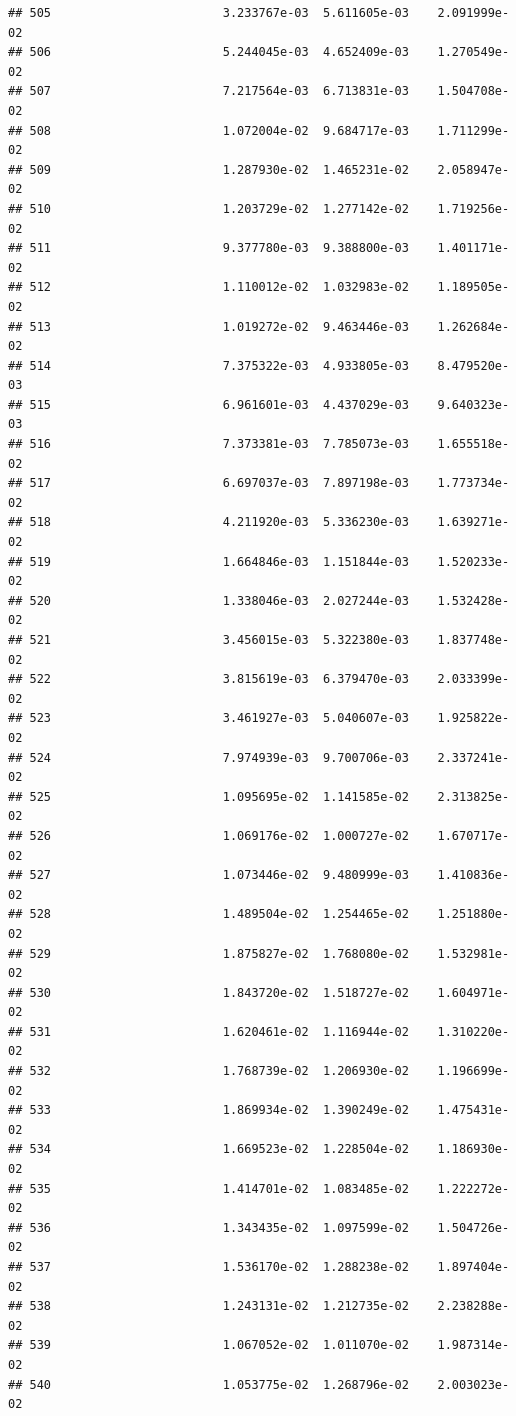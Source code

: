 \documentclass[
]{article}
\begin{document}
\begin{verbatim}
## 505                        3.233767e-03  5.611605e-03    2.091999e-02
## 506                        5.244045e-03  4.652409e-03    1.270549e-02
## 507                        7.217564e-03  6.713831e-03    1.504708e-02
## 508                        1.072004e-02  9.684717e-03    1.711299e-02
## 509                        1.287930e-02  1.465231e-02    2.058947e-02
## 510                        1.203729e-02  1.277142e-02    1.719256e-02
## 511                        9.377780e-03  9.388800e-03    1.401171e-02
## 512                        1.110012e-02  1.032983e-02    1.189505e-02
## 513                        1.019272e-02  9.463446e-03    1.262684e-02
## 514                        7.375322e-03  4.933805e-03    8.479520e-03
## 515                        6.961601e-03  4.437029e-03    9.640323e-03
## 516                        7.373381e-03  7.785073e-03    1.655518e-02
## 517                        6.697037e-03  7.897198e-03    1.773734e-02
## 518                        4.211920e-03  5.336230e-03    1.639271e-02
## 519                        1.664846e-03  1.151844e-03    1.520233e-02
## 520                        1.338046e-03  2.027244e-03    1.532428e-02
## 521                        3.456015e-03  5.322380e-03    1.837748e-02
## 522                        3.815619e-03  6.379470e-03    2.033399e-02
## 523                        3.461927e-03  5.040607e-03    1.925822e-02
## 524                        7.974939e-03  9.700706e-03    2.337241e-02
## 525                        1.095695e-02  1.141585e-02    2.313825e-02
## 526                        1.069176e-02  1.000727e-02    1.670717e-02
## 527                        1.073446e-02  9.480999e-03    1.410836e-02
## 528                        1.489504e-02  1.254465e-02    1.251880e-02
## 529                        1.875827e-02  1.768080e-02    1.532981e-02
## 530                        1.843720e-02  1.518727e-02    1.604971e-02
## 531                        1.620461e-02  1.116944e-02    1.310220e-02
## 532                        1.768739e-02  1.206930e-02    1.196699e-02
## 533                        1.869934e-02  1.390249e-02    1.475431e-02
## 534                        1.669523e-02  1.228504e-02    1.186930e-02
## 535                        1.414701e-02  1.083485e-02    1.222272e-02
## 536                        1.343435e-02  1.097599e-02    1.504726e-02
## 537                        1.536170e-02  1.288238e-02    1.897404e-02
## 538                        1.243131e-02  1.212735e-02    2.238288e-02
## 539                        1.067052e-02  1.011070e-02    1.987314e-02
## 540                        1.053775e-02  1.268796e-02    2.003023e-02

\end{verbatim}
\end{document}
